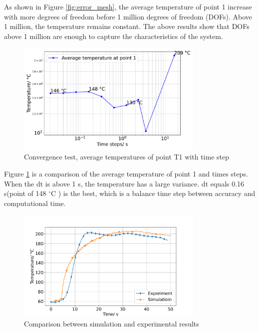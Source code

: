  As shown in Figure \ref{fig:error_mesh}, the average temperature of point 1 increase with more degrees of freedom before 1 million degrees of freedom (DOFs). Above 1 million, the temperature remains constant.  The above results show that DOFs above 1 million are enough to capture the characteristics of the system. 
\begin{figure}[h]
    \centering
  
    \includegraphics[width=0.8\textwidth]{book/chapters/zhang/graphics/T_ave_vs_dt.pdf}
    \caption{Convergence test, average temperatures of point T1 with time step}
    \label{fig:error_time}
\end{figure}


Figure \ref{fig:error_time} is a comparison of the average temperature of point 1 and times steps. When the dt is above 1 s, the temperature has a large variance.  dt equals 0.16 s(point of 148 $^{\circ}\text{C}$ ) is the best, which is a balance time step between accuracy and computational time.

\begin{figure}[h]
    \centering
    \includegraphics[width=0.8\textwidth]{book/chapters/zhang/graphics/T_sim_exe.pdf}
    \caption{Comparison between simulation and experimental results}
    \label{fig:experiment}
\end{figure}

